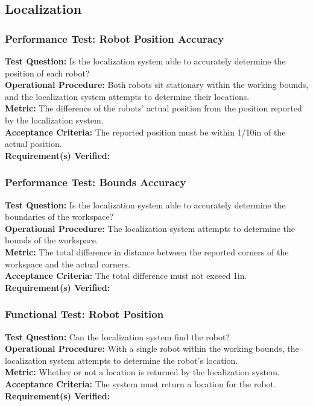 
\subsection{Localization}
\label{sec:verification_localization}

\subsubsection{Performance Test: Robot Position Accuracy}
\label{sec:localization_pt_accuracy}
\textbf{Test Question:} Is the localization system able to accurately determine the position of each robot?\\
\textbf{Operational Procedure:} Both robots sit stationary within the working bounds, and the localization system attempts to determine their locations.\\
\textbf{Metric:} The difference of the robots' actual position from the position reported by the localization system. \\
\textbf{Acceptance Criteria:} The reported position must be within 1/10in of the actual position.\\
\textbf{Requirement(s) Verified:} 

\subsubsection{Performance Test: Bounds Accuracy}
\label{sec:localization_pt_bounds}
\textbf{Test Question:} Is the localization system able to accurately determine the boundaries of the workspace?\\
\textbf{Operational Procedure:} The localization system attempts to determine the bounds of the workspace.\\
\textbf{Metric:} The total difference in distance between the reported corners of the workspace and the actual corners.\\
\textbf{Acceptance Criteria:} The total difference must not exceed 1in.\\
\textbf{Requirement(s) Verified:} 

\subsubsection{Functional Test: Robot Position}
\label{sec:localization_ft_robopos}
\textbf{Test Question:} Can the localization system find the robot?\\
\textbf{Operational Procedure:} With a single robot within the working bounds, the localization system attempts to determine the robot's location.\\
\textbf{Metric:} Whether or not a location is returned by the localization system.\\
\textbf{Acceptance Criteria:} The system must return a location for the robot. \\
\textbf{Requirement(s) Verified:} 

